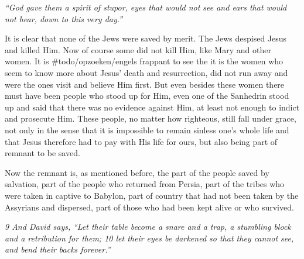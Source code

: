 \emph{``God gave them a spirit of stupor, eyes that would not
see and ears that would not hear, down to this very
day.''}

It is clear that none of the Jews were saved by merit. The Jews despised
Jesus and killed Him. Now of course some did not kill Him, like Mary and
other women. It is \#todo/opzoeken/engels frappant to see the it is the
women who seem to know more about Jesus' death and resurrection, did not
run away and were the ones visit and believe Him first. But even besides
these women there must have been people who stood up for Him, even one
of the Sanhedrin stood up and said that there was no evidence against
Him, at least not enough to indict and prosecute Him. These people, no
matter how righteous, still fall under grace, not only in the sense that
it is impossible to remain sinless one's whole life and that Jesus
therefore had to pay with His life for ours, but also being part of
remnant to be saved.

Now the remnant is, as mentioned before, the part of the people saved by
salvation, part of the people who returned from Persia, part of the
tribes who were taken in captive to Babylon, part of country that had
not been taken by the Assyrians and dispersed, part of those who had
been kept alive or who survived.

\emph{9 And David says,} \emph{``Let their table become a snare and a
trap, a stumbling block and a retribution for them; 10 let
their eyes be darkened so that they cannot see, and bend their
backs forever.''}

